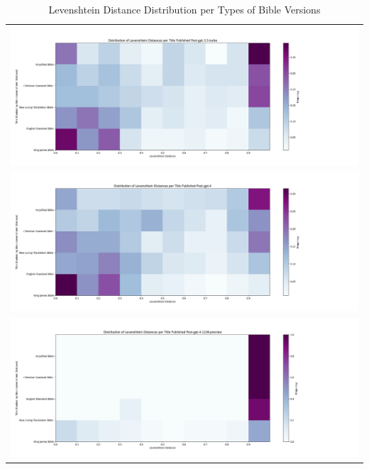 \documentclass{article}
\begin{document}
\begin{table}[ht] 
\centering 
\begin{tabular}{c}  
\includegraphics[width=1.0\textwidth]{plots/bible-versions-gpt-3.5-turbo-2d-histogram.png}  \\  
\includegraphics[width=1.0\textwidth]{plots/bible-versions-gpt-4-2d-histogram.png}  \\  
\includegraphics[width=1.0\textwidth]{plots/bible-versions-gpt-4-1106-preview-2d-histogram.png}  \\  
\end{tabular} 
\caption{Levenshtein Distance Distribution per Types of Bible Versions} 
\label{tab:images} 
\end{table} 



\end{document}

